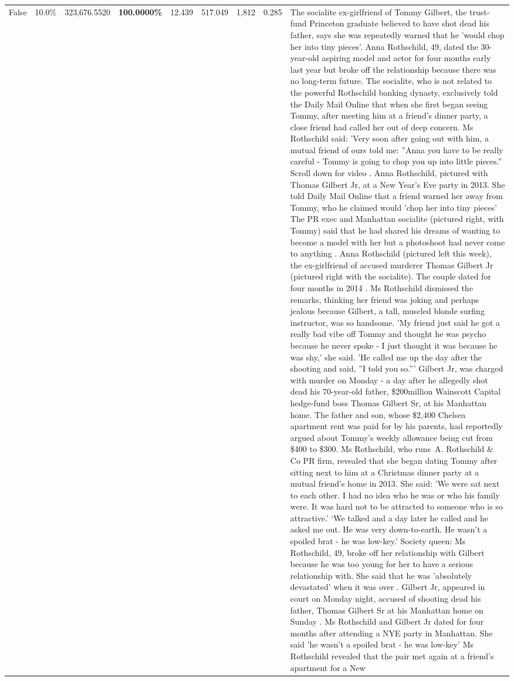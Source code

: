 \begin{table}[H]
\begin{tabular}{lllrlllll}
False & 10.0\% & 323,676.5520 & \bfseries \color{red} 100.0000\% & 12.439 & 517.049 & 1,812 & 0.285 & The socialite ex-girlfriend of Tommy Gilbert, the trust-fund Princeton graduate believed to have shot dead his father, says she was repeatedly warned that he 'would chop her into tiny pieces'. Anna Rothschild, 49, dated the 30-year-old aspiring model and actor for four months early last year but broke off the relationship because there was no long-term future. The socialite, who is not related to the powerful Rothschild banking dynasty, exclusively told the Daily Mail Online that when she first began seeing Tommy, after meeting him at a friend's dinner party, a close friend had called her out of deep concern. Ms Rothschild said: 'Very soon after going out with him, a mutual friend of ours told me: ''Anna you have to be really careful - Tommy is going to chop you up into little pieces.'' Scroll down for video . Anna Rothschild, pictured with Thomas Gilbert Jr, at a New Year's Eve party in 2013. She told Daily Mail Online that a friend warned her away from Tommy, who he claimed would 'chop her into tiny pieces' The PR exec and Manhattan socialite (pictured right, with Tommy) said that he had shared his dreams of wanting to become a model with her but a photoshoot had never come to anything . Anna Rothschild (pictured left this week), the ex-girlfriend of accused murderer Thomas Gilbert Jr (pictured right with the socialite). The couple dated for four months in 2014 . Ms Rothschild dismissed the remarks, thinking her friend was joking and perhaps jealous because Gilbert, a tall, muscled blonde surfing instructor, was so handsome. 'My friend just said he got a really bad vibe off Tommy and thought he was psycho because he never spoke - I just thought it was because he was shy,' she said. 'He called me up the day after the shooting and said, ''I told you so.''' Gilbert Jr, was charged with murder on Monday - a day after he allegedly shot dead his 70-year-old father, \$200million Wainscott Capital hedge-fund boss Thomas Gilbert Sr, at his Manhattan home. The father and son, whose \$2,400 Chelsea apartment rent was paid for by his parents, had reportedly argued about Tommy's weekly allowance being cut from \$400 to \$300. Ms Rothschild, who runs A. Rothschild \& Co PR firm, revealed that she began dating Tommy after sitting next to him at a Christmas dinner party at a mutual friend's home in 2013. She said: 'We were sat next to each other. I had no idea who he was or who his family were. It was hard not to be attracted to someone who is so attractive.' ‘We talked and a day later he called and he asked me out. He was very down-to-earth. He wasn’t a spoiled brat - he was low-key.’ Society queen: Ms Rothschild, 49, broke off her relationship with Gilbert because he was too young for her to have a serious relationship with. She said that he was 'absolutely devastated' when it was over . Gilbert Jr, appeared in court on Monday night, accused of shooting dead his father, Thomas Gilbert Sr at his Manhattan home on Sunday . Ms Rothschild and Gilbert Jr dated for four months after attending a NYE party in Manhattan. She said 'he wasn't a spoiled brat - he was low-key' Ms Rothschild revealed that the pair met again at a friend’s apartment for a New 
\end{tabular}
\end{table}

